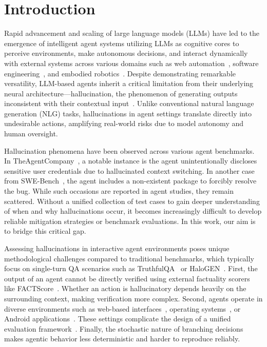 \section{Introduction}

Rapid advancement and scaling of large language models (LLMs) have led to the emergence of intelligent agent systems utilizing LLMs as cognitive cores to perceive environments, make autonomous decisions, and interact dynamically with external systems across various domains such as web automation~\citep{zhou2023webarena,drouin2024workarena}, software engineering~\citep{jimenez2023swe}, and embodied robotics~\cite{shridhar2020alfworld}. Despite demonstrating remarkable versatility, LLM-based agents inherit a critical limitation from their underlying neural architecture---hallucination, the phenomenon of generating outputs inconsistent with their contextual input~\citep{ji2023survey}. 
Unlike conventional natural language generation (NLG) tasks, hallucinations in agent settings translate directly into undesirable actions, amplifying real-world risks due to model autonomy and human oversight. 

Hallucination phenomena have been observed across various agent benchmarks. In TheAgentCompany~\citep{xu2024theagentcompany}, a notable instance is the agent unintentionally discloses sensitive user credentials due to hallucinated context switching. In another case from SWE-Bench~\cite{jimenez2023swe,yang2024swe}, the agent includes a non-existent package to forcibly resolve the bug. While such occasions are reported in agent studies, they remain scattered. Without a unified collection of test cases to gain deeper understanding of when and why hallucinations occur, it becomes increasingly difficult to develop reliable mitigation strategies or benchmark evaluations. In this work, our aim is to bridge this critical gap.


Assessing hallucinations in interactive agent environments poses unique methodological challenges compared to traditional benchmarks, which typically focus on single-turn QA scenarios such as TruthfulQA~\cite{lin2021truthfulqa} or HaloGEN~\cite{ravichander2025halogen}. First, the output of an agent cannot be directly verified using external factuality scorers like FACTScore~\cite{min2023factscore}. Whether an action is hallucinatory depends heavily on the surrounding context, making verification more complex. Second, agents operate in diverse environments such as web-based interfaces~\cite{deng2023mind2web,yao2022webshop,zhou2023webarena,drouin2024workarena,lu2024weblinx,xu2024theagentcompany}, operating systems~\cite{xie2024osworld,wu2024copilot}, or Android applications~\cite{rawles2024androidworld, bai2024digirl}. These settings complicate the design of a unified evaluation framework~\cite{yehudai2025survey}. Finally, the stochastic nature of branching decisions makes agentic behavior less deterministic and harder to reproduce reliably.

